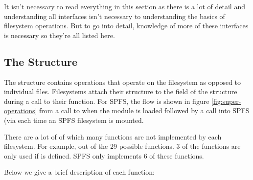 It isn't necessary to read everything in this section as there is a lot of detail and understanding all interfaces isn't necessary to understanding the basics of filesystem operations. But to go into detail, knowledge of more of these interfaces is necessary so they're all listed here.


\subsection{The  Structure}

The  structure contains operations that operate on the filesystem as opposed to individual files. Filesystems attach their  structure to the  field of the  structure during a call to their  function. For SPFS, the flow is shown in figure \ref{fig:super-operations} from a call to  when the module is loaded followed by a call into SPFS (via  each time an SPFS filesystem is mounted.

There are a lot of  of which many functions are not implemented by each filesystem. For example, out of the 29 possible functions. 3 of the functions are only used if  is defined. SPFS only implements 6 of these functions.

Below we give a brief description of each function:

